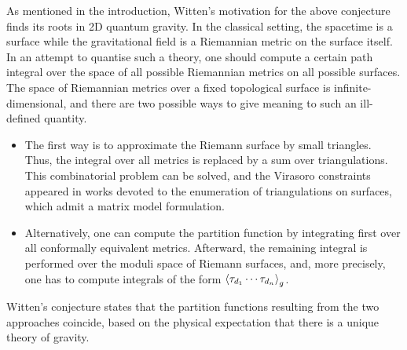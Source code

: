 \documentclass[11pt,reqno]{amsart}
\numberwithin{equation}{section}
\theoremstyle{plain}
\theoremstyle{definition}
\begin{document}
As mentioned in the introduction, Witten's motivation for the above conjecture finds its roots in 2D quantum gravity. In the classical setting, the spacetime is a surface while the gravitational field is a Riemannian metric on the surface itself. In an attempt to quantise such a theory, one should compute a certain path integral over the space of all possible Riemannian metrics on all possible surfaces. The space of Riemannian metrics over a fixed topological surface is infinite-dimensional, and there are two possible ways to give meaning to such an ill-defined quantity.
\begin{itemize}
  \item
  The first way is to approximate the Riemann surface by small triangles. Thus, the integral over all metrics is replaced by a sum over triangulations. This combinatorial problem can be solved, and the Virasoro constraints appeared in works devoted to the enumeration of triangulations on surfaces, which admit a matrix model formulation.

  \item
  Alternatively, one can compute the partition function by integrating first over all conformally equivalent metrics. Afterward, the remaining integral is performed over the moduli space of Riemann surfaces, and, more precisely, one has to compute integrals of the form $\braket{\tau_{d_1} \cdots \tau_{d_n}}_{g}$. 
\end{itemize}
Witten's conjecture states that the partition functions resulting from the two approaches coincide, based on the physical expectation that there is a unique theory of gravity.
\end{document}
